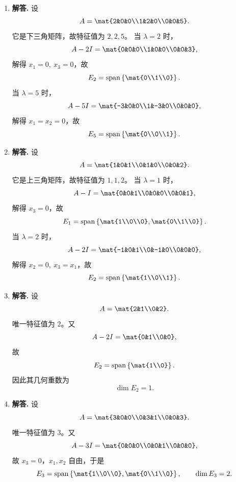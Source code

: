 \begin{enumerate}[label=\textbf{\arabic*.}, leftmargin=*, itemsep=1em]
\item \textbf{解答.} 设
\[
A=\mat{2&0&0\\1&2&0\\0&0&5}.
\]
它是下三角矩阵，故特征值为 \(2,2,5\)。  
当 \(\lambda=2\) 时，
\[
A-2I=\mat{0&0&0\\1&0&0\\0&0&3},
\]
解得 \(x_1=0,\ x_3=0\)，故
\[
E_2=\operatorname{span}\left\{\mat{0\\1\\0}\right\}.
\]
当 \(\lambda=5\) 时，
\[
A-5I=\mat{-3&0&0\\1&-3&0\\0&0&0},
\]
解得 \(x_1=x_2=0\)，故
\[
E_5=\operatorname{span}\left\{\mat{0\\0\\1}\right\}.
\]

\item \textbf{解答.} 设
\[
A=\mat{1&0&1\\0&1&0\\0&0&2}.
\]
它是上三角矩阵，故特征值为 \(1,1,2\)。  
当 \(\lambda=1\) 时，
\[
A-I=\mat{0&0&1\\0&0&0\\0&0&1},
\]
解得 \(x_3=0\)，故
\[
E_1=\operatorname{span}\left\{\mat{1\\0\\0},\mat{0\\1\\0}\right\}.
\]
当 \(\lambda=2\) 时，
\[
A-2I=\mat{-1&0&1\\0&-1&0\\0&0&0},
\]
解得 \(x_2=0,\ x_3=x_1\)，故
\[
E_2=\operatorname{span}\left\{\mat{1\\0\\1}\right\}.
\]

\item \textbf{解答.} 设
\[
A=\mat{2&1\\0&2}.
\]
唯一特征值为 \(2\)。又
\[
A-2I=\mat{0&1\\0&0},
\]
故
\[
E_2=\operatorname{span}\left\{\mat{1\\0}\right\}.
\]
因此其几何重数为
\[
\dim E_2=1.
\]

\item \textbf{解答.} 设
\[
A=\mat{3&0&0\\0&3&1\\0&0&3}.
\]
唯一特征值为 \(3\)。又
\[
A-3I=\mat{0&0&0\\0&0&1\\0&0&0},
\]
故 \(x_3=0\)，\(x_1,x_2\) 自由，于是
\[
E_3=\operatorname{span}\left\{\mat{1\\0\\0},\mat{0\\1\\0}\right\},
\qquad \dim E_3=2.
\]


\end{enumerate}
